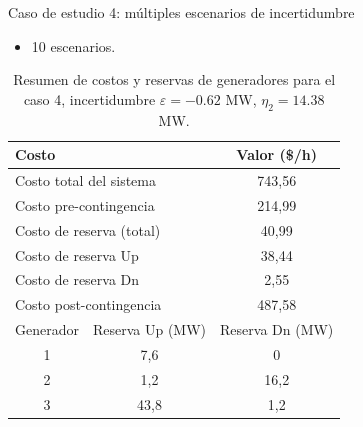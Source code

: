 \begin{frame}{Caso de estudio 4: múltiples escenarios de incertidumbre}
\small
\begin{itemize}
    \item 10 escenarios.
\end{itemize}

\begin{table}[H]
	\renewcommand{\arraystretch}{1.3}
	\centering
	\caption{Resumen de costos y reservas de generadores para el caso 4, incertidumbre $\varepsilon = -0.62$ MW, $\eta_{2} = 14.38$ MW.}
	\label{tab: }
	\begin{tabular}{|c|c|c|}
		\hline
		\multicolumn{2}{|l|}{Costo} & Valor (\$/h) \\
		\hline
		\multicolumn{2}{|l|}{Costo total del sistema} & 743,56 \\
		\multicolumn{2}{|l|}{Costo pre-contingencia} & 214,99 \\
		\multicolumn{2}{|l|}{Costo de reserva (total)} & 40,99 \\
		\multicolumn{2}{|l|}{Costo de reserva Up} & 38,44 \\
		\multicolumn{2}{|l|}{Costo de reserva Dn} & 2,55 \\
		\multicolumn{2}{|l|}{Costo post-contingencia} & 487,58 \\
		\hline \hline
		Generador & Reserva Up (MW) & Reserva Dn (MW) \\
		\hline
		1 & 7,6 & 0 \\
		2 & 1,2 & 16,2 \\
		3 & 43,8 & 1,2 \\
		\hline
	\end{tabular}
\end{table}
\end{frame}
